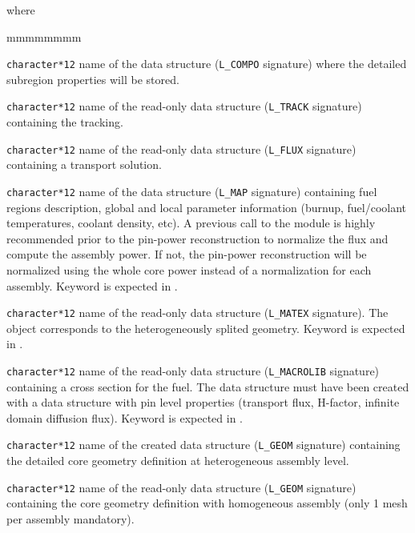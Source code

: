 \noindent
where
\begin{ListeDeDescription}{mmmmmmmm}

\item[\dusa{COMPO}] {\tt character*12} name of the  data
structure ({\tt L\_COMPO} signature) where the detailed subregion properties will be stored.

\item[\dusa{TRKNAM}] {\tt character*12} name of the read-only  data
structure ({\tt L\_TRACK} signature) containing the tracking. 

\item[\dusa{FLUNAM}] {\tt character*12} name of the read-only  data
structure ({\tt L\_FLUX} signature) containing a transport solution.

\item[\dusa{MAP}] {\tt character*12} name of the  data
structure ({\tt L\_MAP} signature) containing fuel regions description, global and
local parameter information (burnup, fuel/coolant temperatures, coolant density, etc). A previous call to the  module is highly recommended prior to the pin-power reconstruction to normalize the flux and compute the assembly power. If not, the pin-power reconstruction  will be normalized using the whole core power instead of a normalization for each assembly.
Keyword  is expected in .

\item[\dusa{MATEX}] {\tt character*12} name of the read-only  data
structure ({\tt L\_MATEX} signature). The object corresponds to the heterogeneously splited geometry. Keyword  is expected in .

\item[\dusa{MACRES}] {\tt character*12} name of the read-only  data
structure ({\tt L\_MACROLIB} signature) containing a cross section for the fuel. The  data
structure must have been created with a  data structure with pin level properties (transport flux, H-factor, infinite domain diffusion flux). Keyword  is expected in .

\item[\dusa{GEONEW}] {\tt character*12} name of the created  data
structure ({\tt L\_GEOM} signature) containing the detailed core geometry definition at heterogeneous assembly level.

\item[\dusa{GEOOLD}] {\tt character*12} name of the read-only  data
structure ({\tt L\_GEOM} signature) containing the core geometry definition with homogeneous assembly (only 1 mesh per assembly mandatory).


\end{ListeDeDescription}
